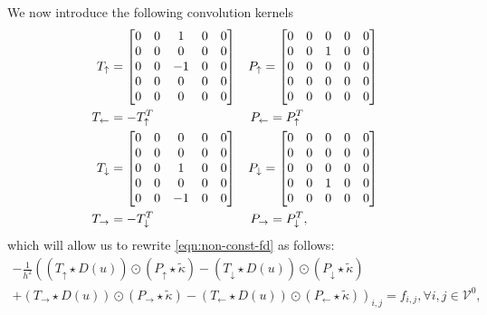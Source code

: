 \documentclass[preprint,12pt]{elsarticle}
\begin{document}
We now introduce the following convolution kernels
\begin{align}
    \begin{split}
    T_{\uparrow} &= \begin{bmatrix} 0 & 0 & 1 & 0 & 0 \\ 0 & 0 & 0 & 0 & 0 \\ 0 & 0 & -1 & 0 & 0 \\ 0 & 0 & 0 & 0 & 0 \\ 0 & 0 & 0 & 0 & 0 \end{bmatrix} \hspace{3mm} 
    P_{\uparrow} = \begin{bmatrix} 0 & 0 & 0 & 0 & 0 \\ 0 & 0 & 1 & 0 & 0 \\ 0 & 0 & 0 & 0 & 0 \\ 0 & 0 & 0 & 0 & 0 \\ 0 & 0 & 0 & 0 & 0 \end{bmatrix} \\
    T_{\leftarrow} &= -T_{\uparrow}^T \hspace{26.95mm} P_{\leftarrow} = P_{\uparrow}^T \\
    T_{\downarrow} &= \begin{bmatrix} 0 & 0 & 0 & 0 & 0 \\ 0 & 0 & 0 & 0 & 0 \\ 0 & 0 & 1 & 0 & 0 \\ 0 & 0 & 0 & 0 & 0 \\ 0 & 0 & -1 & 0 & 0 \end{bmatrix} \hspace{3mm} 
    P_{\downarrow} = \begin{bmatrix} 0 & 0 & 0 & 0 & 0 \\ 0 & 0 & 0 & 0 & 0 \\ 0 & 0 & 0 & 0 & 0 \\ 0 & 0 & 1 & 0 & 0 \\ 0 & 0 & 0 & 0 & 0 \end{bmatrix} \\
    T_{\rightarrow} &= -T_{\downarrow}^T \hspace{26.95mm} P_{\rightarrow} = P_{\downarrow}^T, \\
    \end{split}
\end{align}
which will allow us to rewrite \eqref{eqn:non-const-fd} as follows:
\begin{multline} \label{eqn:non-const-est}
    -\frac{1}{h^2} \left( \left(T_{\uparrow} \star D(u)\right) \odot \left(P_{\uparrow} \star \tilde{\kappa}\right) - \left(T_{\downarrow} \star D(u)\right) \odot \left(P_{\downarrow} \star \tilde{\kappa}\right) \right.\\
    \left. + \left(T_{\rightarrow} \star D(u)\right) \odot \left(P_{\rightarrow} \star \tilde{\kappa}\right) - \left(T_{\leftarrow} \star D(u)\right) \odot \left(P_{\leftarrow} \star \tilde{\kappa}\right) \right)_{i,j} = f_{i,j}, \forall i,j \in \mathcal{V}^0, \quad
\end{multline}
\end{document}
